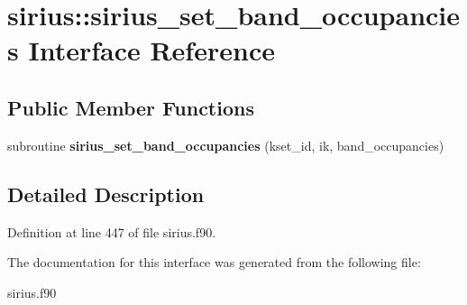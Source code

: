 \hypertarget{interfacesirius_1_1sirius__set__band__occupancies}{}\section{sirius\+:\+:sirius\+\_\+set\+\_\+band\+\_\+occupancies Interface Reference}
\label{interfacesirius_1_1sirius__set__band__occupancies}
\subsection*{Public Member Functions}
\begin{DoxyCompactItemize}
\item 
\hypertarget{interfacesirius_1_1sirius__set__band__occupancies_a772f5d3575078ae661d565fc9144e20d}{}subroutine {\bfseries sirius\+\_\+set\+\_\+band\+\_\+occupancies} (kset\+\_\+id, ik, band\+\_\+occupancies)\label{interfacesirius_1_1sirius__set__band__occupancies_a772f5d3575078ae661d565fc9144e20d}

\end{DoxyCompactItemize}


\subsection{Detailed Description}


Definition at line 447 of file sirius.\+f90.



The documentation for this interface was generated from the following file\+:\begin{DoxyCompactItemize}
\item 
sirius.\+f90\end{DoxyCompactItemize}
